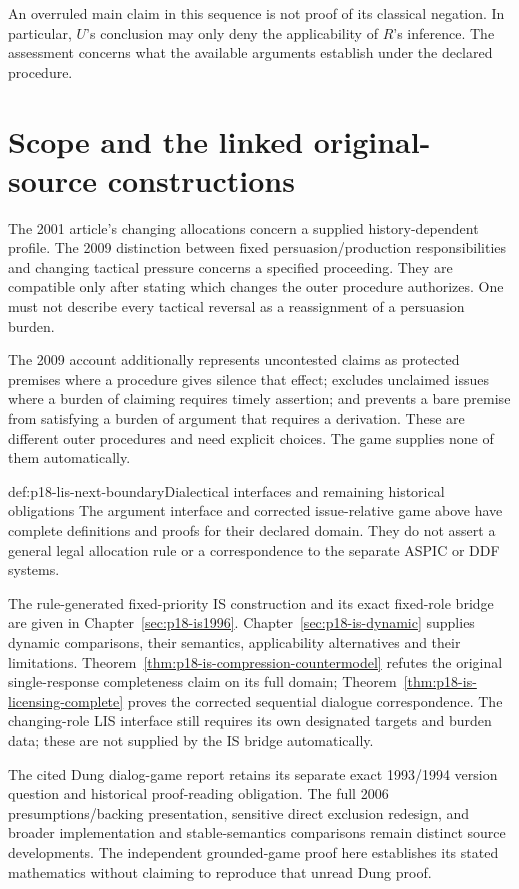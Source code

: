 An overruled main claim in this sequence is not proof of its
classical negation. In particular, \(U\)'s conclusion may only
deny the applicability of \(R\)'s inference. The assessment
concerns what the available arguments establish under the
declared procedure.

\section{Scope and the linked original-source constructions}

The 2001 article's changing allocations concern a supplied
history-dependent profile. The 2009 distinction between fixed
persuasion/production responsibilities and changing tactical
pressure concerns a specified proceeding. They are compatible
only after stating which changes the outer procedure authorizes.
One must not describe every tactical reversal as a reassignment
of a persuasion burden.

The 2009 account additionally represents uncontested claims as
protected premises where a procedure gives silence that effect;
excludes unclaimed issues where a burden of claiming requires
timely assertion; and prevents a bare premise from satisfying
a burden of argument that requires a derivation.
These are different outer procedures and need explicit choices.
The game supplies none of them automatically.

\begin{proofboundary}{def:p18-lis-next-boundary}{Dialectical interfaces and remaining historical obligations}
The argument interface and corrected issue-relative game above
have complete definitions and proofs for their declared domain.
They do not assert a general legal allocation rule or a
correspondence to the separate ASPIC or DDF systems.

The rule-generated fixed-priority IS construction and its exact
fixed-role bridge are given in Chapter~\ref{sec:p18-is1996}.
Chapter~\ref{sec:p18-is-dynamic} supplies dynamic comparisons,
their semantics, applicability alternatives and their limitations.
Theorem~\ref{thm:p18-is-compression-countermodel} refutes the
original single-response completeness claim on its full domain;
Theorem~\ref{thm:p18-is-licensing-complete} proves the corrected
sequential dialogue correspondence. The changing-role LIS
interface still requires its own designated targets and burden
data; these are not supplied by the IS bridge automatically.

The cited Dung dialog-game report retains its separate exact
1993/1994 version question and historical proof-reading obligation.
The full 2006 presumptions/backing presentation, sensitive direct
exclusion redesign, and broader implementation and stable-semantics
comparisons remain distinct source developments.
The independent grounded-game proof here establishes its stated
mathematics without claiming to reproduce that unread Dung proof.
\end{proofboundary}
